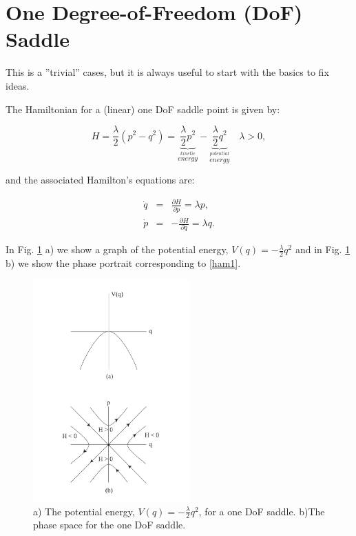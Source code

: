 \documentclass{article}
\begin{document}
\section*{One Degree-of-Freedom (DoF) Saddle}


This is a ''trivial'' cases, but it is always useful to start with the basics to fix ideas.

The Hamiltonian for a (linear) one DoF saddle point is given by:

\begin{equation}
H = \frac{\lambda}{2} \left(p^2 - q^2 \right) =  \underbrace{\frac{\lambda}{2}  p^2}_{\stackrel{kinetic}{ energy}}-  \underbrace{\frac{\lambda}{2}  q^2}_{\stackrel{potential}{ energy}} \quad \lambda >0,
\label{ham1}
\end{equation}



\noindent
and the associated Hamilton's equations are:

\begin{eqnarray}
\dot{q} & = & \frac{\partial H}{\partial p}= \lambda p, \nonumber \\
\dot{p} & = & -\frac{\partial H}{\partial q}= \lambda q.
\label{hameq1}
\end{eqnarray}




\noindent
In Fig. \ref{fig:1 dof saddle} a) we show a graph of the potential energy, $V(q) =-\frac{\lambda}{2} q^2$  and in Fig. \ref{fig:1 dof saddle} b) we show the phase portrait corresponding to \eqref{ham1}. 

\begin{figure}[htb!]
\begin{center}
\includegraphics[width=6.0cm]{fig_1_dof_saddle.png}
\end{center}
\caption{a) The potential energy, $V(q) =-\frac{\lambda}{2} q^2$,  for a one DoF saddle. b)The phase space for the one DoF saddle.}
\label{fig:1 dof saddle}
\end{figure}
\end{document}
